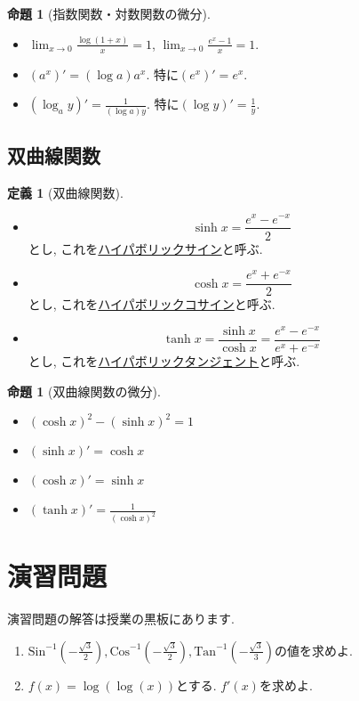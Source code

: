 \documentclass[dvipdfmx,a4paper,11pt]{article}
\newcommand{\Sin}{\text{Sin}^{-1}}
\newcommand{\Cos}{\text{Cos}^{-1}}
\newcommand{\Tan}{\text{Tan}^{-1}}
\theoremstyle{definition}
\newtheorem{prop}[thm]{命題}
\newtheorem{dfn}[thm]{定義}
\begin{document}
    \begin{tcolorbox}[
    colback = white,
    colframe = green!35!black,
    fonttitle = \bfseries,
    breakable = true]
    \begin{prop}[指数関数・対数関数の微分]
    \text{}
 \begin{itemize}
 \item  $\lim_{x \rightarrow 0} \frac{\log (1+x)}{x} =1$, $\lim_{x \rightarrow 0} \frac{e^x -1}{x} =1$.
 \item  $(a^x)' = (\log a) a^x$. 特に$(e^x)' = e^x$.
  \item  $(\log_{a} y)' = \frac{1}{(\log a) y}$. 特に$(\log y)' = \frac{1}{y}$.
 \end{itemize}
 \end{prop}
   \end{tcolorbox}

 \subsection{双曲線関数}
 
 \begin{tcolorbox}[
    colback = white,
    colframe = green!35!black,
    fonttitle = \bfseries,
    breakable = true]
    \begin{dfn}[双曲線関数]
    \text{}
 \begin{itemize}
 \item    $$
\sinh x = \frac{e^x - e^{-x}}{2}
$$
 とし, これを\underline{ハイパボリックサイン}と呼ぶ.
 \item    $$
\cosh x = \frac{e^x + e^{-x}}{2}
$$
 とし, これを\underline{ハイパボリックコサイン}と呼ぶ.
 \item    $$
\tanh x = \frac{\sinh x}{\cosh x}= \frac{e^x - e^{-x}}{e^x + e^{-x}}
$$
 とし, これを\underline{ハイパボリックタンジェント}と呼ぶ.
 \end{itemize}
 \end{dfn}
   \end{tcolorbox}
   
       \begin{tcolorbox}[
    colback = white,
    colframe = green!35!black,
    fonttitle = \bfseries,
    breakable = true]
    \begin{prop}[双曲線関数の微分]
    \text{}
 \begin{itemize}
\item $(\cosh x)^2 - (\sinh x)^2 = 1$ 
 \item  $(\sinh x)' = \cosh x$
 \item  $(\cosh x)' = \sinh x$
  \item  $(\tanh x)' = \frac{1}{(\cosh x)^2}$
 \end{itemize}
 \end{prop}
   \end{tcolorbox}


 
\section{演習問題}
演習問題の解答は授業の黒板にあります.
\begin{enumerate}
\item $\Sin(- \frac{\sqrt{3}}{2}), \Cos(- \frac{\sqrt{3}}{2}), \Tan(- \frac{\sqrt{3}}{3})$の値を求めよ.
\item $f(x) = \log(\log (x))$とする. $f'(x)$を求めよ.
\end{enumerate}



 
\end{document}
